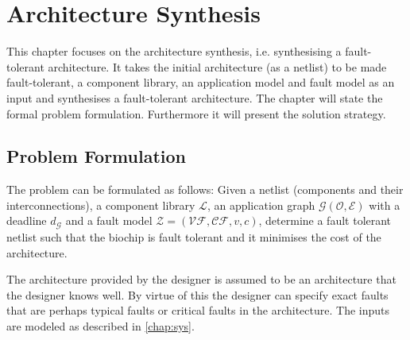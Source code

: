 \chapter{Architecture Synthesis}
\label{chap:arch-syn}
This chapter focuses on the architecture synthesis, i.e. synthesising a fault-tolerant architecture. It takes the initial architecture (as a netlist) to be made fault-tolerant, a component library, an application model and fault model as an input and synthesises a fault-tolerant architecture. The chapter will state the formal problem formulation. Furthermore it will present the solution strategy.


\section{Problem Formulation}
\label{sec:prob-for}
The problem can be formulated as follows: Given a netlist (components and their interconnections), a component library $\mathcal{L}$, an application graph $\mathcal{G}(\mathcal{O}, \mathcal{E})$ with a deadline $d_\mathcal{G}$ and a fault model $\mathcal{Z} = (\mathcal{VF}, \mathcal{CF}, v, c)$, determine a fault tolerant netlist such that the biochip is fault tolerant and it minimises the cost of the architecture.

The architecture provided by the designer is assumed to be an architecture that the designer knows well. By virtue of this the designer can specify exact faults that are perhaps typical faults or critical faults in the architecture. The inputs are modeled as described in \autoref{chap:sys}.

